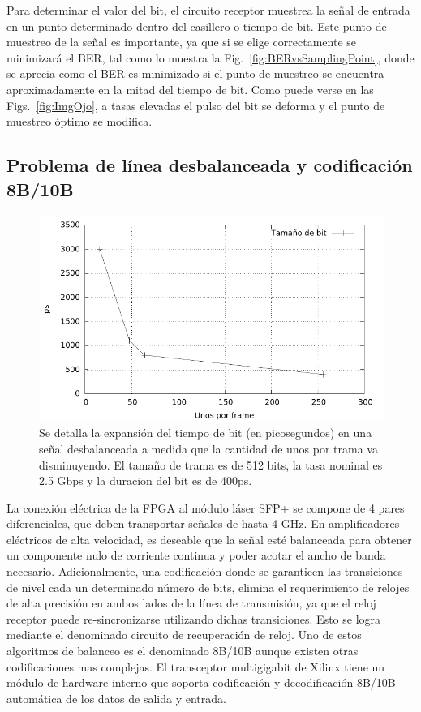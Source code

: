 Para determinar el valor del bit, el circuito receptor muestrea la señal de entrada en un punto determinado dentro del casillero o tiempo de bit. Este punto de muestreo de la señal es importante, ya que si se elige correctamente se minimizará el BER, tal como lo muestra la Fig.~\ref{fig:BERvsSamplingPoint}, donde se aprecia como el BER es minimizado si el punto de muestreo se encuentra aproximadamente en la mitad del tiempo de bit. 
Como puede verse en las Figs.~\ref{fig:ImgOjo}, a tasas elevadas el pulso del bit se deforma y el punto de muestreo óptimo se modifica.


\subsection{Problema de línea desbalanceada y codificación 8B/10B}
\label{problemacodificacion}
\begin{figure}[t]
  \centering
    \includegraphics[width=5in]{graphs/expansionbit.pdf}
\caption {Se detalla la expansión del tiempo de bit (en picosegundos) en una señal desbalanceada a medida que la cantidad de unos por trama va disminuyendo. El tamaño de trama es de 512 bits, la tasa nominal es 2.5 Gbps y la duracion del bit es de 400ps.}
\label{fig:expansionbit}
\end{figure}

\label{problema8b10b}
La conexión eléctrica de la FPGA al módulo láser SFP+ se compone de 4 pares diferenciales, que deben transportar señales de hasta 4 GHz. En amplificadores eléctricos de alta velocidad, es deseable que la señal esté balanceada para obtener un componente nulo de corriente continua y poder acotar el ancho de banda necesario. Adicionalmente, una codificación donde se garanticen las transiciones de nivel cada un determinado número de bits, elimina el requerimiento de relojes de alta precisión en ambos lados de la línea de transmisión, ya que el reloj receptor puede re-sincronizarse utilizando dichas transiciones. Esto se logra mediante el denominado circuito de recuperación de reloj.
Uno de estos algoritmos de balanceo es el denominado 8B/10B aunque existen otras codificaciones mas complejas. El transceptor multigigabit de Xilinx tiene un módulo de hardware interno que soporta codificación y decodificación 8B/10B automática de los datos de salida y entrada.

